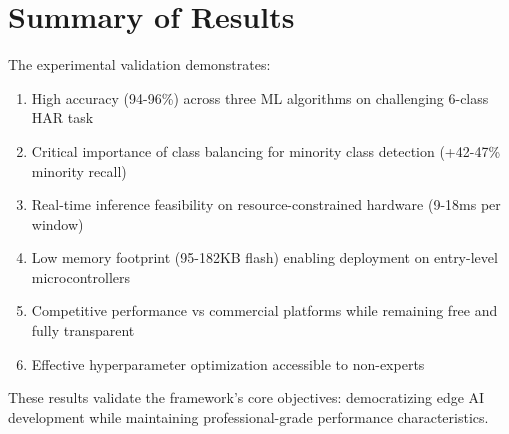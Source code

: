 \section{Summary of Results}
The experimental validation demonstrates:
\begin{enumerate}
    \item High accuracy (94-96\%) across three ML algorithms on challenging 6-class HAR task
    \item Critical importance of class balancing for minority class detection (+42-47\% minority recall)
    \item Real-time inference feasibility on resource-constrained hardware (9-18ms per window)
    \item Low memory footprint (95-182KB flash) enabling deployment on entry-level microcontrollers
    \item Competitive performance vs commercial platforms while remaining free and fully transparent
    \item Effective hyperparameter optimization accessible to non-experts
\end{enumerate}

These results validate the framework's core objectives: democratizing edge AI development while maintaining professional-grade performance characteristics.